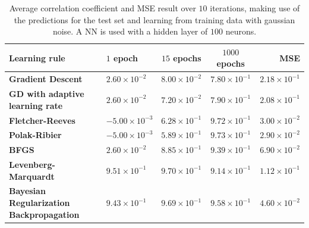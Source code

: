 \documentclass[a4paper,10pt]{article}
\begin{document}
\begin{table}
	\centering
	\begin{tabular}{@{}l|lccr@{}} \toprule
		\textbf{Learning rule}    & $ 1 $ epoch & $ 15 $ epochs & $ 1000 $ epochs & MSE \\\midrule
		\textbf{Gradient Descent}    & $ 2.60\times10^{-2} $  & $ 8.00\times10^{-2} $  & $ 7.80\times10^{-1} $ & $ 2.18\times10^{-1} $ \\
		\textbf{GD with adaptive learning rate} & $ 2.60\times10^{-2} $  & $ 7.20\times10^{-2} $  & $ 7.90\times10^{-1} $ & $ 2.08\times10^{-1} $  \\
		\textbf{Fletcher-Reeves} & $ -5.00\times10^{-3} $  & $6.28\times10^{-1} $  & $ 9.72\times10^{-1} $ & $ 3.00\times10^{-2} $ \\
		\textbf{Polak-Ribier} & $ -5.00\times10^{-3} $  & $ 5.89\times10^{-1} $  & $ 9.73\times10^{-1} $ & $ 2.90\times10^{-2} $  \\
		\textbf{BFGS} & $ 2.60\times10^{-2} $  & $ 8.85\times10^{-1} $  & $ 9.39\times10^{-1} $ & $ 6.90\times10^{-2} $ \\
		\textbf{Levenberg-Marquardt} & $ 9.51\times10^{-1} $  & $ 9.70\times10^{-1} $  & $9.14\times10^{-1} $ & $ 1.12\times10^{-1} $ \\
		\textbf{Bayesian Regularization Backpropagation} & $ 9.43\times10^{-1} $  & $ 9.69\times10^{-1}$  & $ 9.58\times10^{-1} $ & $ 4.60\times10^{-2} $ \\ \bottomrule
	\end{tabular}
	\caption{Average correlation coefficient and MSE result over $ 10 $ iterations, making use of the predictions for the test set and learning from training data with gaussian noise. A NN is used with a hidden layer of $ 100 $ neurons.}
	\label{tab:over_para}
\end{table}





%
\end{document}
